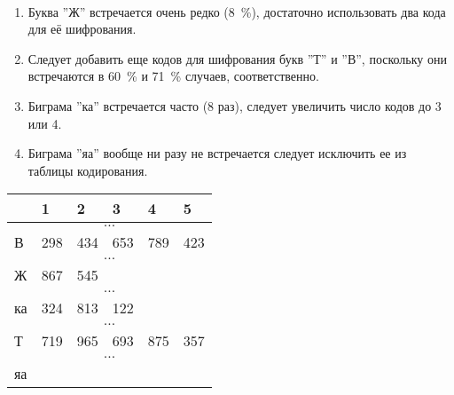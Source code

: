 \begin{solution}
  \\
  \begin{enumerate}
    \item Буква ''Ж'' встречается очень редко (8~\%), достаточно использовать
      два кода для её шифрования.
    \item Следует добавить еще кодов для шифрования букв ''Т'' и ''В'',
      поскольку они встречаются в 60~\% и 71~\% случаев, соответственно.
    \item Биграма ''ка'' встречается часто (8 раз), следует увеличить число
      кодов до 3 или 4.
    \item Биграма ''яа'' вообще ни разу не встречается следует исключить ее из
      таблицы кодирования.
  \end{enumerate}

  \begin{table}[H]
    \centering
    \begin{tabular}{|l|l|l|l|l|l|}
      \hline
      & 1   & 2   & 3   & 4   & 5   \\ \hline
      \multicolumn{6}{|c|}{$\dots$}        \\ \hline
      В  & 298 & 434 & 653 & 789 & 423    \\ \hline
      \multicolumn{6}{|c|}{$\dots$}        \\ \hline
      Ж  & 867 & 545 &  &  &  \\ \hline
      \multicolumn{6}{|c|}{$\dots$}        \\ \hline
      ка & 324 & 813 & 122  &     &     \\ \hline
      \multicolumn{6}{|c|}{$\dots$}        \\ \hline
      Т  & 719 & 965 & 693 & 875 & 357 \\ \hline
      \multicolumn{6}{|c|}{$\dots$}        \\ \hline
      яа &   &     &     &     &     \\ \hline
    \end{tabular}
  \end{table}
\end{solution}
